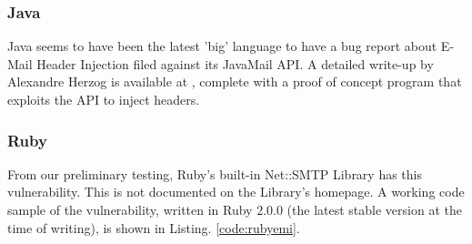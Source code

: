 \subsubsection{Java} 
Java seems to have been the latest 'big' language to have a bug report about E-Mail Header Injection filed against its JavaMail API. A detailed write-up by Alexandre Herzog is available at \cite{Herzog.2014}, complete with a proof of concept program that exploits the API to inject headers.

\subsubsection{Ruby}
From our preliminary testing, Ruby's built-in Net::SMTP Library has this vulnerability. This is not documented on the Library's homepage.
A working code sample of the vulnerability, written in Ruby 2.0.0 (the latest stable version at the time of writing), is shown in Listing. \ref{code:rubyemi}.



